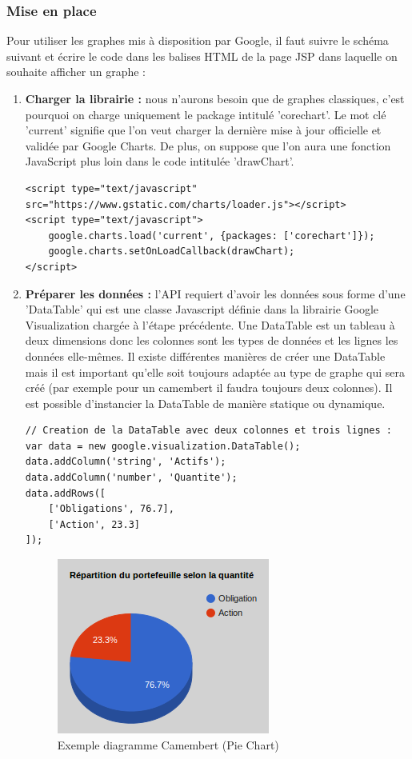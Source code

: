 \subsubsection{Mise en place}
Pour utiliser les graphes mis à disposition par Google, il faut suivre le schéma suivant et écrire le code dans les balises HTML de la page JSP dans laquelle on souhaite afficher un graphe :
\begin{enumerate}
 \item \textbf{Charger la librairie :} nous n'aurons besoin que de graphes classiques, c'est pourquoi on charge uniquement le package intitulé 'corechart'. Le mot clé 'current' signifie que l'on veut charger la dernière mise à jour officielle et validée par Google Charts. De plus, on suppose que l'on aura une fonction JavaScript plus loin dans le code intitulée 'drawChart'.
\begin{lstlisting}
<script type="text/javascript" src="https://www.gstatic.com/charts/loader.js"></script>
<script type="text/javascript">
    google.charts.load('current', {packages: ['corechart']});
    google.charts.setOnLoadCallback(drawChart);
</script>
\end{lstlisting}
 \item \textbf{Préparer les données :} l'API requiert d'avoir les données sous forme d'une 'DataTable' qui est une classe Javascript définie dans la librairie Google Visualization chargée à l'étape précédente. Une DataTable est un tableau à deux dimensions donc les colonnes sont les types de données et les lignes les données elle-mêmes. Il existe différentes manières de créer une DataTable mais il est important qu'elle soit toujours adaptée au type de graphe qui sera créé (par exemple pour un camembert il faudra toujours deux colonnes). Il est possible d'instancier la DataTable de manière statique ou dynamique.
\begin{lstlisting}
// Creation de la DataTable avec deux colonnes et trois lignes :
var data = new google.visualization.DataTable();
data.addColumn('string', 'Actifs');
data.addColumn('number', 'Quantite');
data.addRows([
    ['Obligations', 76.7],
    ['Action', 23.3]
]);
\end{lstlisting}


\begin{figure}[H]
  \center
  \includegraphics[scale=0.5]{../graph/camembertAPI.png}
  \caption{Exemple diagramme Camembert (Pie Chart)}
\end{figure}
\end{enumerate}


